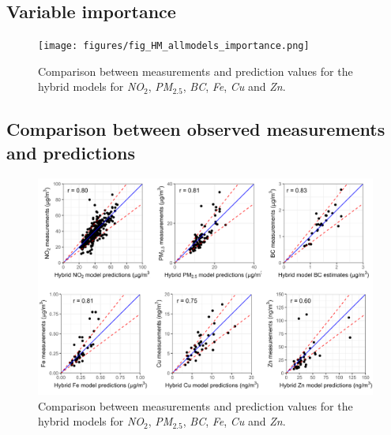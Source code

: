 \documentclass{article}
\begin{document}
\subsection{Variable importance}

\captionsetup[figure]{skip=6pt}
\begin{figure}[!htb]
\texttt{[image: figures/fig\_HM\_allmodels\_importance.png]}
\caption{Comparison between measurements and prediction values for the hybrid models for \textit{NO$_2$}, \textit{PM$_{2.5}$}, \textit{BC}, \textit{Fe}, \textit{Cu} and \textit{Zn}.}
\label{fig2}
\end{figure}

\newpage

\subsection{Comparison between observed measurements and predictions}

\captionsetup[figure]{skip=6pt}
\begin{figure}[!htb]
\includegraphics[width=1.0\textwidth]{figures/fig_HM_test_all_models.png}
\caption{Comparison between measurements and prediction values for the hybrid models for \textit{NO$_2$}, \textit{PM$_{2.5}$}, \textit{BC}, \textit{Fe}, \textit{Cu} and \textit{Zn}.}
\label{fig2}
\end{figure}









\end{document}
